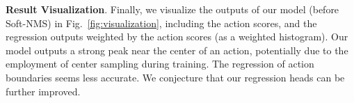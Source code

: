 \smallskip
\noindent \textbf{Result Visualization}. Finally, we visualize the outputs of our model (before Soft-NMS) in Fig.\ \ref{fig:visualization}, including the action scores, and the regression outputs weighted by the action scores (as a weighted histogram). Our model outputs a strong peak near the center of an action, potentially due to the employment of center sampling during training. The regression of action boundaries seems less accurate. We conjecture that our regression heads can be further improved. 



